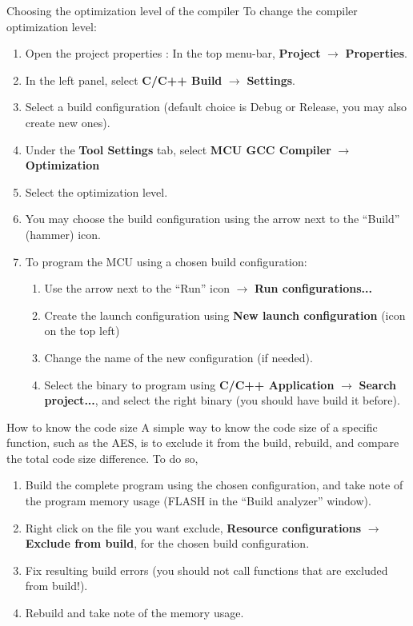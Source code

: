 \begin{bclogo}[couleur = gray!20, arrondi = 0.2, logo=\bcinfo]{Choosing the optimization level of the compiler}
	To change the compiler optimization level:
	\begin{enumerate}
		\item Open the project properties : In the top menu-bar, \textbf{Project} $\rightarrow$ \textbf{Properties}.
		\item In the left panel, select \textbf{C/C++ Build} $\rightarrow$ \textbf{Settings}.
		\item Select a build configuration (default choice is Debug or Release, you may also create new ones).
		\item Under the \textbf{Tool Settings} tab, select \textbf{MCU GCC Compiler} $\rightarrow$ \textbf{Optimization}
		\item Select the optimization level.
		\item You may choose the build configuration using the arrow next to the ``Build'' (hammer) icon.
		\item To program the MCU using a chosen build configuration:
		\begin{enumerate}
			\item Use the arrow next to the ``Run'' icon $\rightarrow$ \textbf{Run configurations...}
			\item Create the launch configuration using \textbf{New launch configuration} (icon on the top left)
			\item Change the name of the new configuration (if needed).
			\item Select the binary to program using \textbf{C/C++ Application}
			$\rightarrow$ \textbf{Search project...}, and select the right
			binary (you should have build it before).
		\end{enumerate}
	\end{enumerate}
\end{bclogo}


\begin{bclogo}[couleur = gray!20, arrondi = 0.2, logo=\bcinfo]{How to know the code size}
	A simple way to know the code size of a specific function, such as the AES, is
	to exclude it from the build, rebuild, and compare the total code size
	difference. To do so,
	\begin{enumerate}
		\item Build the complete program using the chosen configuration, and take
		note of the program memory usage (FLASH in the ``Build analyzer''
		window).
		\item Right click on the file you want exclude, \textbf{Resource
			configurations} $\rightarrow$ \textbf{Exclude from build}, for the chosen build configuration.
		\item Fix resulting build errors (you should not call functions that are excluded from build!).
		\item Rebuild and take note of the memory usage.
	\end{enumerate}
\end{bclogo}
